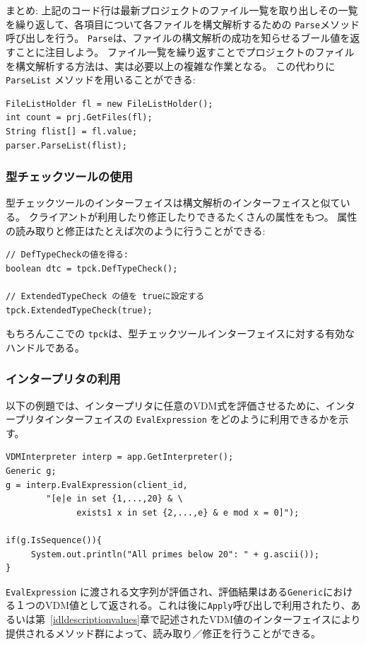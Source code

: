 \documentclass[\pformat,12pt]{jarticle}
\begin{document}
まとめ: 上記のコード行は最新プロジェクトのファイル一覧を取り出しその一覧を繰り返して、各項目について各ファイルを構文解析するための {\tt Parse}メソッド呼び出しを行う。
 {\tt Parse}は、ファイルの構文解析の成功を知らせるブール値を返すことに注目しよう。
ファイル一覧を繰り返すことでプロジェクトのファイルを構文解析する方法は、実は必要以上の複雑な作業となる。
この代わりに{\tt ParseList} メソッドを用いることができる:

\begin{verbatim}
FileListHolder fl = new FileListHolder();
int count = prj.GetFiles(fl);
String flist[] = fl.value;
parser.ParseList(flist);
\end{verbatim}

\subsubsection{型チェックツールの使用}

型チェックツールのインターフェイスは構文解析のインターフェイスと似ている。
クライアントが利用したり修正したりできるたくさんの属性をもつ。
属性の読み取りと修正はたとえば次のように行うことができる:

\begin{verbatim}
// DefTypeCheckの値を得る:
boolean dtc = tpck.DefTypeCheck();

// ExtendedTypeCheck の値を trueに設定する
tpck.ExtendedTypeCheck(true);
\end{verbatim}

もちろんここでの \texttt{tpck}は、型チェックツールインターフェイスに対する有効なハンドルである。


\subsubsection{インタープリタの利用}\label{java:interp}

以下の例題では、インタープリタに任意のVDM式を評価させるために、インタープリタインターフェイスの {\tt EvalExpression} をどのように利用できるかを示す。

\begin{verbatim}
VDMInterpreter interp = app.GetInterpreter();
Generic g;
g = interp.EvalExpression(client_id, 
        "[e|e in set {1,...,20} & \
              exists1 x in set {2,...,e} & e mod x = 0]");

if(g.IsSequence()){
     System.out.println("All primes below 20": " + g.ascii());
}
\end{verbatim}

{\tt EvalExpression} に渡される文字列が評価され、評価結果はある{\tt Generic}における１つのVDM値として返される。これは後に{\tt Apply}呼び出しで利用されたり、あるいは第~\ref{idldescriptionvalues}章で記述されたVDM値のインターフェイスにより提供されるメソッド群によって、読み取り／修正を行うことができる。
\end{document}
